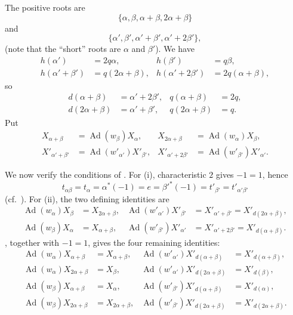 The positive roots are
\[
 \{\alpha,\beta,\alpha+\beta,2\alpha+\beta\}
\]
and
\[
 \{\alpha',\beta',\alpha'+\beta',\alpha'+2\beta'\},
\]
(note that the ``short'' roots are \(\alpha\) and \(\beta'\)). We have
\[
\begin{aligned}
 h(\alpha')&=2q\alpha,&h(\beta')&=q\beta,\\
 h(\alpha'+\beta')&=q(2\alpha+\beta),&
 h(\alpha'+2\beta')&=2q(\alpha+\beta),
\end{aligned}
\]
so
\[
\begin{aligned}
 d(\alpha+\beta)&=\alpha'+2\beta',&q(\alpha+\beta)&=2q,\\
 d(2\alpha+\beta)&=\alpha'+\beta',&q(2\alpha+\beta)&=q.
\end{aligned}
\]
Put
\[
\begin{aligned}
 X_{\alpha+\beta}&=\operatorname{Ad}(w_\beta)X_\alpha,&
 X_{2\alpha+\beta}&=\operatorname{Ad}(w_\alpha)X_\beta,\\
 X'_{\alpha'+\beta'}&=\operatorname{Ad}(w'_{\alpha'})X'_{\beta'},&
 X'_{\alpha'+2\beta'}&=\operatorname{Ad}(w'_{\beta'})X'_{\alpha'}.
\end{aligned}
\]

We now verify the conditions of . For (i), characteristic \(2\)
gives \(-1=1\), hence
\[
 t_{\alpha\beta}=t_\alpha=\alpha^*(-1)=e
   =\beta'^*(-1)=t'_{\beta'}=t'_{\alpha'\beta'}
\]
(cf.\ ).
For (ii), the two defining identities are
\[
\begin{aligned}
 \operatorname{Ad}(w_\alpha)X_\beta
  &=X_{2\alpha+\beta},&
 \operatorname{Ad}(w'_{\alpha'})X'_{\beta'}
  &=X'_{\alpha'+\beta'}=X'_{d(2\alpha+\beta)},\\
 \operatorname{Ad}(w_\beta)X_\alpha
  &=X_{\alpha+\beta},&
 \operatorname{Ad}(w'_{\beta'})X'_{\alpha'}
  &=X'_{\alpha'+2\beta'}=X'_{d(\alpha+\beta)}.
\end{aligned}
\]
, together with \(-1=1\), gives the four
remaining identities:
\[
\begin{aligned}
 \operatorname{Ad}(w_\alpha)X_{\alpha+\beta}&=X_{\alpha+\beta},&
 \operatorname{Ad}(w'_{\alpha'})X'_{d(\alpha+\beta)}
   &=X'_{d(\alpha+\beta)},\\
 \operatorname{Ad}(w_\alpha)X_{2\alpha+\beta}&=X_\beta,&
 \operatorname{Ad}(w'_{\alpha'})X'_{d(2\alpha+\beta)}
   &=X'_{d(\beta)},\\
 \operatorname{Ad}(w_\beta)X_{\alpha+\beta}&=X_\alpha,&
 \operatorname{Ad}(w'_{\beta'})X'_{d(\alpha+\beta)}
   &=X'_{d(\alpha)},\\
 \operatorname{Ad}(w_\beta)X_{2\alpha+\beta}&=X_{2\alpha+\beta},&
 \operatorname{Ad}(w'_{\beta'})X'_{d(2\alpha+\beta)}
   &=X'_{d(2\alpha+\beta)}.
\end{aligned}
\]

